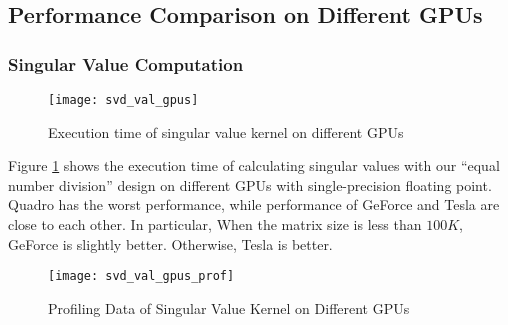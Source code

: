 \subsection{Performance Comparison on Different GPUs}

\subsubsection{Singular Value Computation}
\begin{figure}[hbpt]
\centering
\texttt{[image: svd\_val\_gpus]}
\caption{Execution time of singular value kernel on different GPUs}
\label{fig:svd_val}
\vspace{-0.1in}
\end{figure}
Figure \ref{fig:svd_val} shows the execution time of calculating singular values with our ``equal number division'' design on different GPUs with single-precision floating point.
Quadro has the worst performance, while performance of GeForce and Tesla are close to each other.
In particular, When the matrix size is less than $100K$, GeForce is slightly better. Otherwise, Tesla is better. 




\begin{figure}[hbpt]
\centering
\texttt{[image: svd\_val\_gpus\_prof]}
\caption{Profiling Data of Singular Value Kernel on Different GPUs}
\label{fig:svd_val_prof}
\vspace{-0.1in}
\end{figure}

